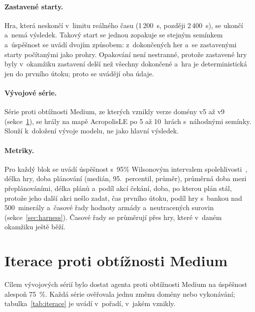\paragraph{Zastavené starty.} Hra, která neskončí v~limitu reálného času (1\,200~s, později 2\,400~s), se ukončí a~nemá výsledek. Takový start se jednou zopakuje se stejným semínkem a~úspěšnost se uvádí dvojím způsobem: z~dokončených her a~se zastavenými starty počítanými jako prohry. Opakování není nestranné, protože zastavené hry byly v~okamžiku zastavení delší než všechny dokončené a~hra je deterministická jen do prvního útoku; proto se uvádějí oba údaje.

\paragraph{Vývojové série.} Série proti obtížnosti Medium, ze kterých vznikly verze domény v5 až v9 (sekce~\ref{sec:iterace}), se hrály na mapě AcropolisLE po 5 až 10~hrách s~náhodnými semínky. Slouží k~doložení vývoje modelu, ne jako hlavní výsledek.

\paragraph{Metriky.} Pro každý blok se uvádí úspěšnost s~95\% Wilsonovým intervalem spolehlivosti~\cite{Wilson1927}, délka hry, doba plánování (medián, 95.~percentil, průměr), průměrná doba mezi přeplánováními, délka plánů a~podíl akcí čekání, doba, po kterou plán stál, protože jeho další akci nešlo zadat, čas prvního útoku, podíl hry s~bankou nad 500~minerály a~časové řady hodnoty armády a~neutracených surovin (sekce~\ref{sec:harness}). Časové řady se průměrují přes hry, které v~daném okamžiku ještě běží.

\section{Iterace proti obtížnosti Medium}
\label{sec:iterace}

Cílem vývojových sérií bylo dostat agenta proti obtížnosti Medium na úspěšnost alespoň 75~\%. Každá série ověřovala jednu změnu domény nebo vykonávání; tabulka~\ref{tab:iterace} je uvádí v~pořadí, v~jakém vznikly.

